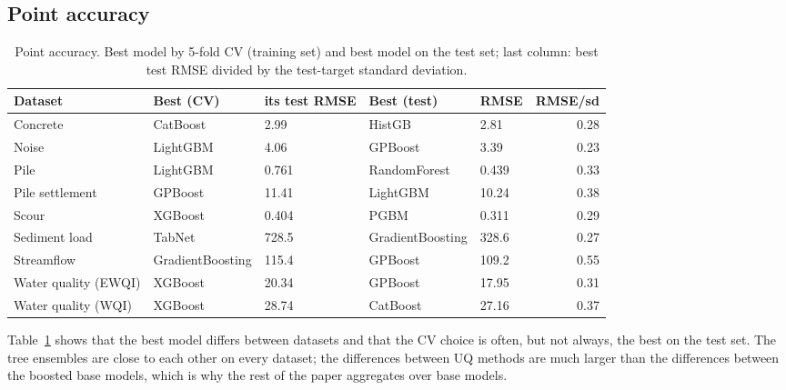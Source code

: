 \documentclass[11pt]{article}
\begin{document}
\subsection{Point accuracy}
\begin{table}[t]\centering\small
\caption{Point accuracy. Best model by 5-fold CV (training set) and best model on the test set; last column: best test RMSE divided by the test-target standard deviation.}\label{tab:acc}
\begin{tabular}{lllllr}\toprule Dataset & Best (CV) & its test RMSE & Best (test) & RMSE & RMSE/sd\\\midrule
Concrete & CatBoost & 2.99 & HistGB & 2.81 & 0.28\\
Noise & LightGBM & 4.06 & GPBoost & 3.39 & 0.23\\
Pile & LightGBM & 0.761 & RandomForest & 0.439 & 0.33\\
Pile settlement & GPBoost & 11.41 & LightGBM & 10.24 & 0.38\\
Scour & XGBoost & 0.404 & PGBM & 0.311 & 0.29\\
Sediment load & TabNet & 728.5 & GradientBoosting & 328.6 & 0.27\\
Streamflow & GradientBoosting & 115.4 & GPBoost & 109.2 & 0.55\\
Water quality (EWQI) & XGBoost & 20.34 & GPBoost & 17.95 & 0.31\\
Water quality (WQI) & XGBoost & 28.74 & CatBoost & 27.16 & 0.37\\
\bottomrule\end{tabular}\end{table}
Table~\ref{tab:acc} shows that the best model differs between datasets and that the CV choice is often, but not always, the best on the test set.
The tree ensembles are close to each other on every dataset; the differences between UQ methods are much larger than the differences between the
boosted base models, which is why the rest of the paper aggregates over base models.
\end{document}

